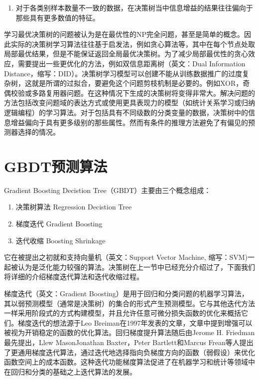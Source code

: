 \begin{enumerate}
    \item 对于各类别样本数量不一致的数据，在决策树当中信息增益的结果往往偏向于那些具有更多数值的特征。
\end{enumerate}

学习最优决策树的问题被认为是在最优性的NP完全问题，甚至是简单的概念。因此实际的决策树学习算法往往基于启发法，例如贪心算法等，其中在每个节点处取局部最优结果，但是不能保证返回全局最优决策树。为了减少局部最优性的贪心效应，需要提出一些更优化的方法，例如双信息距离树（英文：Dual Information Distance，缩写：DID）\cite{ben2014efficient}。决策树学习模型可以创建不能从训练数据推广的过度复杂树，这就是所谓的过拟合，要避免这个问题剪枝机制是必要的。例如XOR，奇偶校验或多路复用器问题。在这种情况下生成的决策树将变得非常大。解决问题的方法包括改变问题域的表达方式或使用更具表现力的模型（如统计关系学习或归纳逻辑编程）的学习算法。对于包括具有不同级数的分类变量的数据，决策树中的信息增益偏向于具有更多级别的那些属性。然而有条件的推理方法避免了有偏见的预测器选择的情况。

\section{GBDT预测算法}

Gradient Boosting Decistion Tree（GBDT）主要由三个概念组成：

\begin{enumerate}
    \item 决策树算法 Regression Decistion Tree
    \item 梯度迭代 Gradient Boosting
    \item 迭代收缩 Boosting Shrinkage
\end{enumerate}
它在被提出之初就和支持向量机（英文：Support Vector Machine, 缩写：SVM)一起被认为是泛化能力较强的算法。决策树在上一节中已经充分介绍过了，下面我们将详细的介绍梯度迭代算法和迭代收缩过程。

梯度迭代（英文：Gradient Boosting）\cite{friedman2002stochastic}是用于回归和分类问题的机器学习算法，其以弱预测模型（通常是决策树）的集合的形式产生预测模型。它与其他迭代方法一样采用阶段式的方式构建模型，并且允许任意可微分损失函数的优化来概括它们。梯度迭代的想法源于Leo Breiman\cite{breiman1997arcing}在1997年发表的文章，文章中提到增强可以被视为开销稳定的函数的优化算法。回归梯度提升算法随后由Jerome H. Friedman\cite{friedman2001greedy}\cite{friedman2002stochastic}最先提出，Llew Mason\cite{mason1999boosting}Jonathan Baxter，Peter Bartlett和Marcus Frean等人提出了更通用梯度迭代算法，通过迭代地选择指向负梯度方向的函数（弱假设）来优化函数空间上的成本函数。这种迭代功能梯度算法促进了在机器学习和统计等领域中在回归和分类的基础之上迭代算法的发展。

